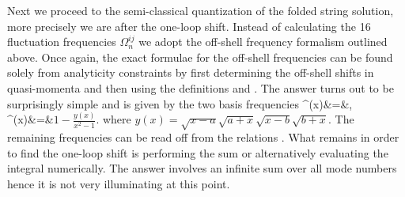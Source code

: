 Next we proceed to the semi-classical quantization of the folded string solution, more precisely we are after the one-loop shift.
Instead of calculating the 16 fluctuation frequencies $\Omega_n^{ij}$ we adopt the off-shell frequency formalism outlined above.
Once again, the exact formulae for the off-shell frequencies can be found solely from analyticity constraints by first determining the off-shell shifts in quasi-momenta and then using the definitions  and .
The answer turns out to be surprisingly simple and is given by the two basis frequencies
\beqa
\label{oma}
\Omega^{}(x)&=&\;,\\
\label{oms}
\Omega^{}(x)&=&\(1-\frac{y(x)}{x^2-1}\)\;.
\eeqa
where $y(x)=\sqrt{x-a} \sqrt{a+x} \sqrt{x-b} \sqrt{b+x}$.
The remaining frequencies can be read off from the relations .
What remains in order to find the one-loop shift is performing the sum  or alternatively evaluating the integral  numerically.
The answer involves an infinite sum over all mode numbers hence it is not very illuminating at this point.

